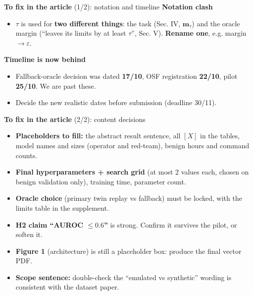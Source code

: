 \documentclass[aspectratio=169]{beamer}
\newcommand{\key}[1]{\textcolor{accent}{\textbf{#1}}}
\newcommand{\warn}[1]{\textcolor{accent2}{\textbf{#1}}}
\begin{document}
\begin{frame}{\warn{To fix in the article} (1/2): notation and timeline}
\textbf{Notation clash}
\begin{itemize}
  \item $\tau$ is used for \key{two different things}: the task (Sec. IV,
        $\mathbf{m}_\tau$) and the oracle margin (``leaves its limits by at least
        $\tau$'', Sec. V). \warn{Rename one}, e.g. margin $\to \varepsilon$.
\end{itemize}
\vspace{0.4em}
\textbf{Timeline is now behind}
\begin{itemize}
  \item Fallback-oracle decision was dated \warn{17/10}, OSF registration
        \warn{22/10}, pilot \warn{25/10}. We are past these.
  \item Decide the new realistic dates before submission (deadline 30/11).
\end{itemize}
\end{frame}

\begin{frame}{\warn{To fix in the article} (2/2): content decisions}
\begin{itemize}
  \item \textbf{Placeholders to fill:} the abstract result sentence, all
        $[X]$ in the tables, model names and sizes (operator and red-team),
        benign hours and command counts.
  \item \textbf{Final hyperparameters + search grid} (at most 2 values each,
        chosen on benign validation only), training time, parameter count.
  \item \textbf{Oracle choice} (primary twin replay vs fallback) must be
        locked, with the limits table in the supplement.
  \item \textbf{H2 claim ``AUROC $\le 0.6$''} is strong. Confirm it survives the
        pilot, or soften it.
  \item \textbf{Figure 1} (architecture) is still a placeholder box: produce the
        final vector PDF.
  \item \textbf{Scope sentence:} double-check the ``emulated vs synthetic''
        wording is consistent with the dataset paper.
\end{itemize}
\end{frame}
\end{document}
